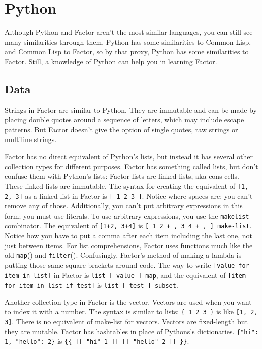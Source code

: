\documentclass{article}
\begin{document}
\section{Python}

Although Python and Factor aren't the most similar languages, you can still see many similarities through them. Python has some similarities to Common Lisp, and Common Lisp to Factor, so by that proxy, Python has some similarities to Factor. Still, a knowledge of Python can help you in learning Factor.

\subsection{Data}

Strings in Factor are similar to Python. They are immutable and can be made by placing double quotes around a sequence of letters, which may include escape patterns. But Factor doesn't give the option of single quotes, raw strings or multiline strings.

Factor has no direct equivalent of Python's lists, but instead it has several other collection types for different purposes. Factor has something called lists, but don't confuse them with Python's lists: Factor lists are linked lists, aka cons cells. These linked lists are immutable. The syntax for creating the equivalent of \verb|[1, 2, 3]| as a linked list in Factor is \verb|[ 1 2 3 ]|. Notice where spaces are: you can't remove any of those. Additionally, you can't put arbitrary expressions in this form; you must use literals. To use arbitrary expressions, you use the \texttt{makelist} combinator. The equivalent of \verb|[1+2, 3+4]| is \verb|[ 1 2 + , 3 4 + , ] make-list|. Notice how you have to put a comma after each item including the last one, not just between items. For list comprehensions, Factor uses functions much like the old \texttt{map}() and \texttt{filter}(). Confusingly, Factor's method of making a lambda is putting those same square brackets around code. The way to write \verb|[value for item in list]| in Factor is \verb|list [ value ] map|, and the equivalent of \verb|[item for item in list if test]| is \verb|list [ test ] subset|.

Another collection type in Factor is the vector. Vectors are used when you want to index it with a number. The syntax is similar to lists: \verb|{ 1 2 3 }| is like \verb|[1, 2, 3]|. There is no equivalent of make-list for vectors. Vectors are fixed-length but they are mutable. Factor has hashtables in place of Pythons's dictionaries. \verb|{"hi": 1, "hello": 2}| is \verb|{{ [[ "hi" 1 ]] [[ "hello" 2 ]] }}|.
\end{document}
